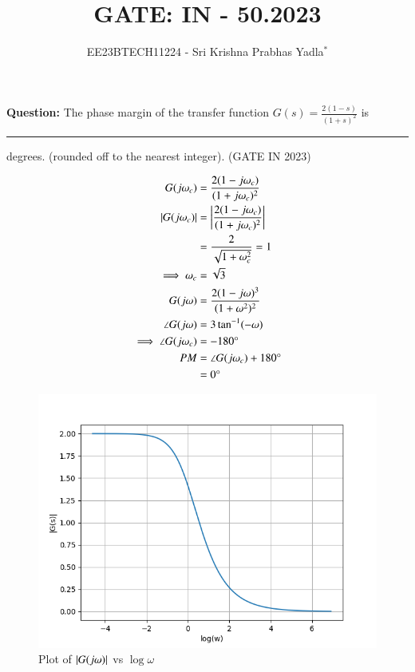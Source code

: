 \documentclass[journal,12pt,twocolumn]{IEEEtran}
\theoremstyle{remark}
\begin{document}

\vspace{3cm}

\title{GATE: IN - 50.2023}
\author{EE23BTECH11224 - Sri Krishna Prabhas Yadla$^{*}$%
}
\maketitle
\newpage
\bigskip

\renewcommand{\thefigure}{\arabic{figure}}
\renewcommand{\thetable}{\arabic{table}}


\vspace{3cm}
\textbf{Question:} The phase margin of the transfer function $G(s) = \frac{2(1-s)}{(1+s)^2}$ is \rule{1cm}{0.15mm} degrees. (rounded off to the nearest integer). \hfill (GATE IN 2023)\\
\solution
\begin{table}[htbp]
	\centering
	\def\arraystrech{1.5}
	
	\caption{}
	\label{tab:parameters}
\end{table}
\begin{align}
	G(j\omega_c) &= \frac{2(1-j\omega_c)}{(1+j\omega_c)^2} \\
	\left\vert G(j\omega_c)\right\vert &= \left\vert\frac{2(1-j\omega_c)}{(1+j\omega_c)^2}\right\vert \\
	&= \frac{2}{\sqrt{1+\omega_c^2}} = 1 \\
	\implies \omega_c &= \sqrt{3} \\
	G(j\omega) &= \frac{2(1-j\omega)^3}{(1+\omega^2)^2} \\
        \angle G(j\omega) &= 3\tan^{-1}(-\omega) \\
	\implies \angle G(j\omega_c)&= -180\degree \\
	PM &= \angle G(j\omega_c) + 180\degree \\
	&= 0\degree
\end{align}
\begin{figure}[htbp]
	\includegraphics[width=\columnwidth]{figs/magnitude.png}
	\caption{Plot of $\left\vert G(j\omega)\right\vert$ vs $\log{\omega}$}
	\label{fig:mag/w}
\end{figure}
\end{document}
